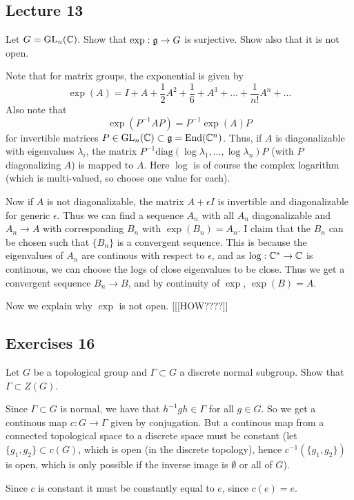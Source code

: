 \documentclass[11pt, english]{article}
\begin{document}
\subsection{Lecture 13}
\begin{exc}
 Let $G = \operatorname{GL}_n(\mathbb{C})$. Show that $\exp:\frak g \to G$ is surjective. Show also that it is not open.
\end{exc}
\begin{sol}
Note that for matrix groups, the exponential is given by
$$
\exp(A) = I + A + \frac 12 A^2 + \frac 16+A^3 + \ldots+\frac{1}{n!}A^n + \ldots
$$
Also note that
$$
\exp(P^{-1}AP) = P^{-1} \exp(A) P
$$
for invertible matrices $P \in \operatorname{GL}_n(\mathbb{C}) \subset \frak g=\operatorname{End}(\mathbb{C}^n)$. Thus, if $A$ is diagonalizable with eigenvalues $\lambda_i$, the matrix $P^{-1}\text{diag}(\log \lambda_1,\ldots,\log \lambda_n)P$ (with $P$ diagonalizing $A$) is mapped to $A$. Here $\log$ is of course the complex logarithm (which is multi-valued, so choose one value for each).

Now if $A$ is not diagonalizable, the matrix $A+\epsilon I$ is invertible and diagonalizable for generic $\epsilon$. Thus we can find a sequence $A_n$ with all $A_n$ diagonalizable and $A_n \to A$ with corresponding $B_n$ with $\exp(B_n)=A_n$. I claim that the $B_n$ can be chosen such that $\{ B_n \}$ is a convergent sequence.  This is because the eigenvalues of $A_n$ are continous with respect to $\epsilon$, and as $\log:\mathbb{C}^\ast \to \mathbb{C}$ is continous, we can choose the logs of close eigenvalues to be close. Thus we get a convergent sequence $B_n \to B$, and by continuity of $\exp$, $\exp(B)=A$.

Now we explain why $\exp$ is not open. [[[HOW????]]
\end{sol}

\subsection{Exercises 16}

\begin{exc}[Exc 2]
Let $G$ be a topological group and $\Gamma \subset G$ a discrete normal subgroup. Show that $\Gamma \subset Z(G)$.
\end{exc}
\begin{sol}
Since $\Gamma \subset G$ is normal, we have that $h^{-1}gh \in \Gamma$ for all $g \in G$. So we get a continous map $c:G \to \Gamma$ given by conjugation. But a continous map from a connected topological space to a discrete space must be constant (let $\{g_1, g_2\} \subset c(G)$, which is open (in the discrete topology), hence $c^{-1}(\{ g_1,g_2 \})$ is open, which is only possible if  the inverse image is $\emptyset$ or all of $G$). 

Since $c$ is constant it must be constantly equal to $e$, since $c(e)=e$.
\end{sol}
\end{document}
